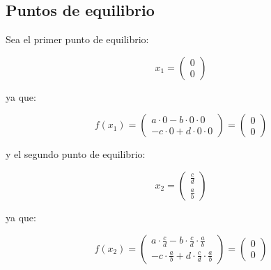         \subsection{Puntos de equilibrio}

            Sea el primer punto de equilibrio:

            \begin{equation*}
                x_1 =
                \begin{pmatrix}
                    0 \\
                    0
                \end{pmatrix}
            \end{equation*}

            ya que:

            \begin{equation*}
                f(x_1) =
                \begin{pmatrix}
                    a \cdot 0 - b \cdot 0 \cdot 0 \\
                    -c \cdot 0 + d \cdot 0 \cdot 0
                \end{pmatrix} =
                \begin{pmatrix}
                    0 \\
                    0
                \end{pmatrix}
            \end{equation*}

            y el segundo punto de equilibrio:

            \begin{equation*}
                x_2 =
                \begin{pmatrix}
                    \frac{c}{d} \\
                    \frac{a}{b}
                \end{pmatrix}
            \end{equation*}

            ya que:

            \begin{equation*}
                f(x_2) =
                \begin{pmatrix}
                    a \cdot \frac{c}{d} - b \cdot \frac{c}{d} \cdot \frac{a}{b} \\
                    -c \cdot \frac{a}{b} + d \cdot \frac{c}{d} \cdot \frac{a}{b}
                \end{pmatrix} =
                \begin{pmatrix}
                    0 \\
                    0
                \end{pmatrix}
            \end{equation*}

